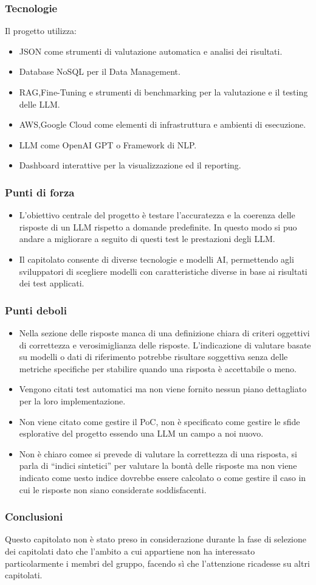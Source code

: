     \subsubsection{Tecnologie}
    Il progetto utilizza:

\begin{itemize}
    \item JSON come strumenti di valutazione automatica e analisi dei risultati.
    \item Database NoSQL per il Data Management.
    \item RAG,Fine-Tuning e strumenti di benchmarking per la valutazione e il testing delle LLM.
    \item AWS,Google Cloud come elementi di infrastruttura e ambienti di esecuzione.
    \item LLM come OpenAI GPT o Framework di NLP.
    \item Dashboard interattive per la visualizzazione ed il reporting.
\end{itemize}
    \subsubsection{Punti di forza}
    \begin{itemize}
    \item L’obiettivo centrale del progetto è testare l’accuratezza e la coerenza delle risposte di un LLM rispetto a domande predefinite. In questo modo si puo andare a migliorare a seguito di questi test le prestazioni degli LLM.
    \item Il capitolato consente di diverse tecnologie e modelli AI, permettendo agli sviluppatori di scegliere modelli con caratteristiche diverse in base ai risultati dei test applicati.
\end{itemize}
    \subsubsection{Punti deboli}
    \begin{itemize}
    \item Nella sezione delle risposte manca di una definizione chiara di criteri oggettivi di correttezza e verosimiglianza delle risposte. L’indicazione di valutare basate su modelli o dati di riferimento potrebbe risultare soggettiva senza delle metriche specifiche per stabilire quando una risposta è accettabile o meno.
    \item Vengono citati test automatici ma non viene fornito nessun piano dettagliato per la loro implementazione.
    \item Non viene citato come gestire il PoC, non è specificato come gestire le sfide esplorative del progetto essendo una LLM un campo a noi nuovo.
    \item Non è chiaro comee si prevede di valutare la correttezza di una risposta, si parla di “indici sintetici” per valutare la bontà delle risposte ma non viene indicato come uesto indice dovrebbe essere calcolato o come gestire il caso in cui le risposte non siano considerate soddisfacenti.
\end{itemize}
    \subsubsection{Conclusioni}
    Questo capitolato non è stato preso in considerazione durante la fase di selezione dei capitolati dato che l’ambito a cui appartiene non ha interessato particolarmente i membri del gruppo, facendo sì che l’attenzione ricadesse su altri capitolati.
